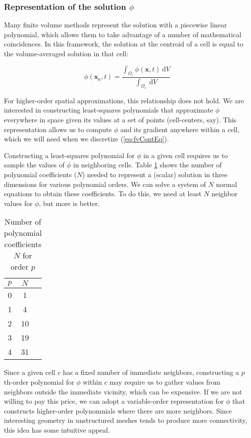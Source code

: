\documentclass[12pt]{article}
\newcommand{\labelTab}[1]{\label{tab:#1}}
\newcommand{\refEq}[1]{(\ref{eq:#1})}
\newcommand{\refTab}[1]{Table \ref{tab:#1}}
\renewcommand{\vec}[1]{\mathbf{#1}}
\newcommand{\dV}{~\mathrm{d}V}
\begin{document}
\subsubsection*{Representation of the solution $\phi$}

Many finite volume methods represent the solution with a piecewise linear polynomial,
which allows them to take advantage of a number of mathematical coincidences. In this 
framework, the solution at the centroid of a cell is equal to the volume-averaged solution
in that cell:

\begin{equation}
\phi(\vec{x_c}, t) = \frac{\int_{\Omega_c} \phi(\vec{x}, t) \dV}{\int_{\Omega_c}\dV}
\end{equation}

\noindent
For higher-order spatial approximations, this relationship does not hold. We 
are interested in constructing least-squares polynomials that approximate $\phi$ 
everywhere in space given its values at a set of points (cell-centers, say). 
This representation allows us to compute $\phi$ and its gradient anywhere within a
cell, which we will need when we discretize \refEq{fvContEq}. 

Constructing a least-squares polynomial for $\phi$ in a given cell requires us to sample 
the values of $\phi$ in neighboring cells. \refTab{polyCoeffsVsOrder} shows the number of polynomial coefficients ($N$)
needed to represent a (scalar) solution in three dimensions for various polynomial orders. 
We can solve a system of $N$ normal equations to obtain these coefficients. To do this, we need at 
least $N$ neighbor values for $\phi$, but more is better. 

\begin{table}
 \centering
 \begin{tabular}{| l | c | r |} 
 \hline
 $p$ & $N$ \\
 \hline
 0 & 1 \\
 1 & 4 \\
 2 & 10 \\
 3 & 19 \\
 4 & 31 \\
 \hline
 \end{tabular}
 \caption{Number of polynomial coefficients $N$ for order $p$}
 \labelTab{polyCoeffsVsOrder}
\end{table}

Since a given cell $c$ has a fixed number of immediate neighbors, constructing a $p$th-order polynomial for $\phi$ within $c$ 
may require us to gather values from neighbors outside the immediate vicinity, which can be expensive. If we are not willing 
to pay this price, we can adopt a variable-order representation for $\phi$ that constructs higher-order polynomnials where 
there are more neighbors. Since interesting geometry in unstructured meshes tends to produce more connectivity, this idea 
has some intuitive appeal.
\end{document}
